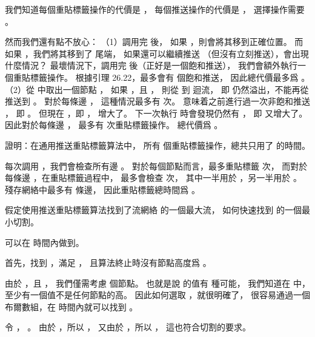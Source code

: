 我們知道每個重貼標籤操作的代價是 ，
每個推送操作的代價是 ，
選擇操作需要 。

然而我們還有點不放心：
（1）調用完  後，
如果 ，則會將其移到正確位置。
而如果 ，我們將其移到了  尾端，
如果還可以繼續推送  （但沒有立刻推送），會出現什麼情況？
最壞情況下，調用完  後（正好是一個飽和推送），
我們會額外執行一個重貼標籤操作。
根據引理 26.22，最多會有  個飽和推送，
因此總代價最多爲 。
（2）從  中取出一個節點 ，
如果 ，且 ，
則從  到  迴流，
即  仍然溢出，不能再從  推送到 。
對於每條邊 ，
這種情況最多有  次。
  意味着之前進行過一次非飽和推送 ，
即 。
但現在 ，即 ，  增大了。
下一次執行  時會發現仍然有 ，
即  又增大了。
因此對於每條邊 ，
最多有  次重貼標籤操作。
總代價爲 。
\stopANSWER

\startEXERCISE
證明：在通用推送重貼標籤算法中，
所有  個重貼標籤操作，總共只用了  的時間。
\stopEXERCISE

\startANSWER
每次調用 ，我們會檢查所有邊 。
對於每個節點而言，最多重貼標籤  次，
而對於每條邊 ，在重貼標籤過程中，
最多會檢查  次，
其中一半用於 ，另一半用於 。
殘存網絡中最多有  條邊，
因此重貼標籤總時間爲 。
\stopANSWER

\startEXERCISE
假定使用推送重貼標籤算法找到了流網絡  的一個最大流，
如何快速找到  的一個最小切割。
\stopEXERCISE

\startANSWER
可以在  時間內做到。

首先，找到 ，滿足 ，
且算法終止時沒有節點高度爲 。

由於 ，且 ，
我們僅需考慮  個節點。
也就是說  的值有  種可能，
我們知道在  中，至少有一個值不是任何節點的高。
因此如何選取 ，就很明確了，
很容易通過一個布爾數組，在  時間內就可以找到 。

令 ， 。
由於 ，所以 ，
又由於 ，所以 ，
這也符合切割的要求。

